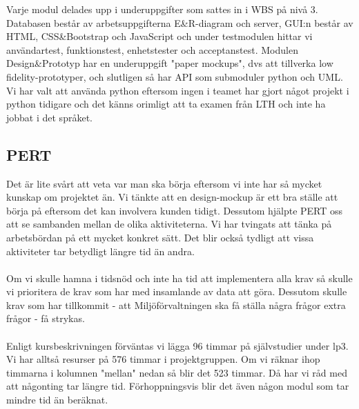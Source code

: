 \documentclass[12pt]{article}
\begin{document}
Varje modul delades upp i underuppgifter som sattes in i WBS på nivå 3. Databasen består av arbetsuppgifterna E\&R-diagram och server, GUI:n består av HTML, CSS\&Bootstrap och JavaScript och under testmodulen hittar vi användartest, funktionstest, enhetstester och acceptanstest. Modulen Design\&Prototyp har en underuppgift "paper mockups", dvs att tillverka low fidelity-prototyper, och slutligen så har API som submoduler python och UML. Vi har valt att använda python eftersom ingen i teamet har gjort något projekt i python tidigare och det känns orimligt att ta examen från LTH och inte ha jobbat i det språket.
\subsection{PERT}

Det är lite svårt att veta var man ska börja eftersom vi inte har så mycket kunskap om projektet än. Vi tänkte att en design-mockup är ett bra ställe att börja på eftersom det kan involvera kunden tidigt. Dessutom hjälpte PERT oss att se sambanden mellan de olika aktiviteterna. Vi har tvingats att tänka på arbetsbördan på ett mycket konkret sätt. Det blir också tydligt att vissa aktiviteter tar betydligt längre tid än andra. \\
\\
\noindent
Om vi skulle hamna i tidsnöd och inte ha tid att implementera alla krav så skulle vi prioritera de krav som har med insamlande av data att göra. Dessutom skulle krav som har tillkommit - att Miljöförvaltningen ska få ställa några frågor extra frågor - få strykas. \\
\\
\noindent
Enligt kursbeskrivningen förväntas vi lägga 96 timmar på självstudier under lp3. Vi har alltså resurser på 576 timmar i projektgruppen. Om vi räknar ihop timmarna i kolumnen "mellan" nedan så blir det 523 timmar. Då har vi råd med att någonting tar längre tid. Förhoppningsvis blir det även någon modul som tar mindre tid än beräknat.
\\
\\
\\
\end{document}
